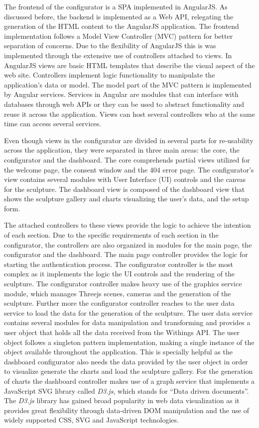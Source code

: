 \documentclass[../medieninformatik-arbeit.tex]{subfiles}
\begin{document}
The frontend of the configurator is a SPA implemented in AngularJS. As discussed before, the backend is implemented as a Web API, relegating the generation of the HTML content to the AngularJS application. The frontend implementation follows a Model View Controller (MVC) pattern for better separation of concerns. Due to the flexibility of AngularJS this is was implemented through the extensive use of controllers attached to views. In AngularJS views are basic HTML templates that describe the visual aspect of the web site. Controllers implement logic functionality to manipulate the application's data or model. The model part of the MVC pattern is implemented by Angular services. Services in Angular are modules that can interface with databases through web APIs or they can be used to abstract functionality and reuse it across the application. Views can host several controllers who at the same time can access several services. 

Even though views in the configurator are divided in several parts for re-usability across the application, they were separated in three main areas: the core, the configurator and the dashboard. The core comprehends partial views utilized for the welcome page, the consent window and the 404 error page. The configurator's view contains several modules with User Interface (UI) controls and the canvas for the sculpture. The dashboard view is composed of the dashboard view that shows the sculpture gallery and charts visualizing the user's data, and the setup form. 

The attached controllers to these views provide the logic to achieve the intention of each section. Due to the specific requirements of each section in the configurator, the controllers are also organized in modules for the main page, the configurator and the dashboard. The main page controller provides the logic for starting the authentication process. The configurator controller is the most complex as it implements the logic the UI controls and the rendering of the sculpture. The configurator controller makes heavy use of the graphics service module, which manages Threejs scenes, cameras and the generation of the sculpture. Further more the configurator controller reaches to the user data service to load the data for the generation of the sculpture. The user data service contains several modules for data manipulation and transforming and provides a user object that holds all the data received from the Withings API. The user object follows a singleton pattern implementation, making a single instance of the object available throughout the application. This is specially helpful as the dashboard configurator also needs the data provided by the user object in order to visualize generate the charts and load the sculpture gallery. For the generation of charts the dashboard controller makes use of a graph service that implements a JavaScript SVG library called \textit{D3.js}\cite{bostock2015d3js}, which stands for ``Data driven documents''. The \textit{D3.js} library has gained broad popularity in web data visualization as it provides great flexibility through data-driven DOM manipulation and the use of widely supported CSS, SVG and JavaScript technologies. 
\end{document}
